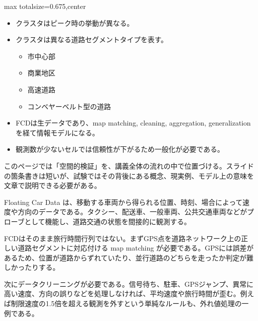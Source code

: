 \clearpage
{}
\begin{adjustbox}{max totalsize={\textwidth}{0.675\textheight},center}
\begin{minipage}{\textwidth}\scriptsize
\begin{minipage}[t]{0.485\textwidth}
\begin{itemize}
\item クラスタはピーク時の挙動が異なる。
\item クラスタは異なる道路セグメントタイプを表す。
\begin{itemize}
\item 市中心部
\item 商業地区
\item 高速道路
\item コンベヤーベルト型の道路
\end{itemize}
\end{itemize}
\begin{itemize}
\item FCDは生データであり、map matching, cleaning, aggregation, generalization を経て情報モデルになる。
\item 観測数が少ないセルでは信頼性が下がるため一般化が必要である。
\end{itemize}
\end{minipage}\hfill
\begin{minipage}[t]{0.485\textwidth}
このページでは「空間的検証」を、講義全体の流れの中で位置づける。スライドの箇条書きは短いが、試験ではその背後にある概念、現実例、モデル上の意味を文章で説明できる必要がある。\par
Floating Car Data は、移動する車両から得られる位置、時刻、場合によって速度や方向のデータである。タクシー、配送車、一般車両、公共交通車両などがプローブとして機能し、道路交通の状態を間接的に観測する。\par
FCDはそのまま旅行時間行列ではない。まずGPS点を道路ネットワーク上の正しい道路セグメントに対応付ける map matching が必要である。GPSには誤差があるため、位置が道路からずれていたり、並行道路のどちらを走ったか判定が難しかったりする。\par
次にデータクリーニングが必要である。信号待ち、駐車、GPSジャンプ、異常に高い速度、方向の誤りなどを処理しなければ、平均速度や旅行時間が歪む。例えば制限速度の1.5倍を超える観測を外すという単純なルールも、外れ値処理の一例である。\par

\end{minipage}
\end{minipage}
\end{adjustbox}
